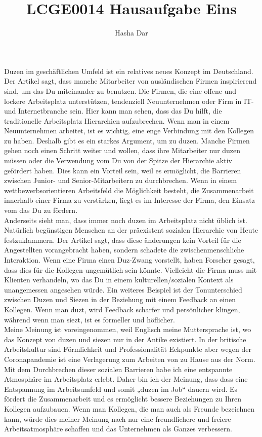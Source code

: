 \documentclass[12pt]{article}
\title{LCGE0014 Hausaufgabe Eins}
\author{Hasha Dar}
\begin{document}
\maketitle

Duzen im gesch{\"a}ftlichen Umfeld ist ein relatives neues Konzept im Deutschland. Der Artikel sagt, dass manche Mitarbeiter von ausl{\"a}ndischen Firmen inspirierend sind, um das Du miteinander zu benutzen. Die Firmen, die eine offene und lockere Arbeitsplatz unterst{\"u}tzen, tendenziell Neuunternehmen oder Firm in IT- und Internetbranche sein. Hier kann man sehen, dass das Du hilft, die traditionelle Arbeitsplatz Hierarchien aufzubrechen. Wenn man in einem Neuunternehmen arbeitet, ist es wichtig, eine enge Verbindung mit den Kollegen zu haben. Deshalb gibt es ein starkes Argument, um zu duzen. Manche Firmen gehen noch einen Schritt weiter und wollen, dass ihre Mitarbeiter nur duzen m{\"u}ssen oder die Verwendung vom Du von der Spitze der Hierarchie aktiv gef{\"o}rdert haben. Dies kann ein Vorteil sein, weil es erm{\"o}glicht, die Barrieren zwischen Junior- und Senior-Mitarbeitern zu durchbrechen. Wenn in einem wettbewerbsorientieren Arbeitsfeld die M{\"o}glichkeit besteht, die Zusammenarbeit innerhalb einer Firma zu verst{\"a}rken, liegt es im Interesse der Firma, den Einsatz vom das Du zu f{\"o}rdern.\\

Anderseits sieht man, dass immer noch duzen im Arbeitsplatz nicht {\"u}blich ist. Nat{\"u}rlich beg{\"u}nstigen Menschen an der pr{\"a}existent sozialen Hierarchie von Heute festzuklammern. Der Artikel sagt, dass diese {\"a}nderungen kein Vorteil f{\"u}r die Angestellten vorangebracht haben, sondern schadete die zwischenmenschliche Interaktion. Wenn eine Firma einen Duz-Zwang vorstellt, haben Forscher gesagt, dass dies f{\"u}r die Kollegen ungem{\"u}tlich sein k{\"o}nnte. Vielleicht die Firma muss mit Klienten verhandeln, wo das Du in einem kulturellen/sozialen Kontext als unangemessen angesehen w{\"u}rde. Ein weiteres Beispiel ist der Tonunterschied zwischen Duzen und Siezen in der Beziehung mit einem Feedback an einen Kollegen. Wenn man duzt, wird Feedback scharfer und pers{\"o}nlicher klingen, w{\"a}hrend wenn man siezt, ist es formeller und h{\"o}flicher. \\

Meine Meinung ist voreingenommen, weil Englisch meine Muttersprache ist, wo das Konzept von duzen und siezen nur in der Antike existiert. In der britische Arbeitskultur sind F{\"o}rmlichkeit und Professionalit{\"a}t Eckpunkte aber wegen der Coronapandemie ist eine Verlagerung zum Arbeiten von zu Hause aus der Norm. Mit dem Durchbrechen dieser sozialen Barrieren habe ich eine entspannte Atmosph{\"a}re im Arbeitsplatz erlebt. Daher bin ich der Meinung, dass dass eine Entspannung im Arbeitsumfeld und somit „duzen im Job“ dauern wird. Es f{\"o}rdert die Zusammenarbeit und es erm{\"o}glicht bessere Beziehungen zu Ihren Kollegen aufzubauen. Wenn man Kollegen, die man auch als Freunde bezeichnen kann, w{\"u}rde dies meiner Meinung nach nur eine freundlichere und freiere Arbeitsatmosph{\"a}re schaffen und das Unternehmen als Ganzes verbessern. 
\end{document}
